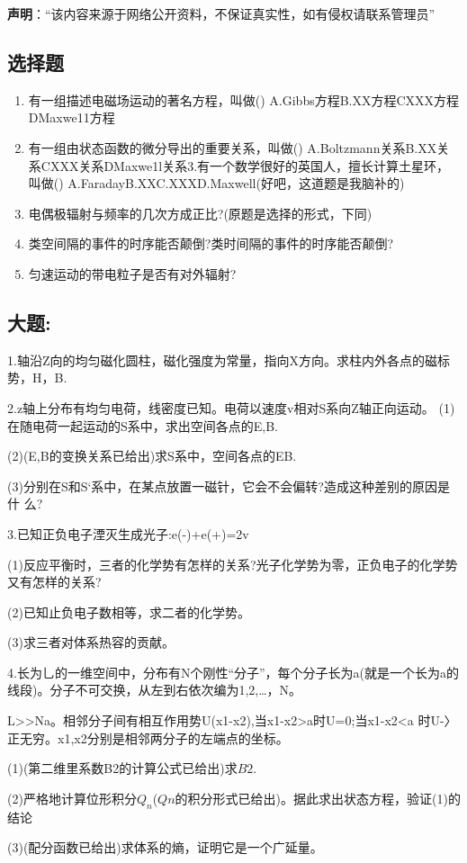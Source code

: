 
\textbf{声明}：“该内容来源于网络公开资料，不保证真实性，如有侵权请联系管理员”

\subsection{选择题}
\begin{enumerate}
\item 有一组描述电磁场运动的著名方程，叫做()
A.Gibbs方程B.XX方程CXXX方程DMaxwe11方程
\item 有一组由状态函数的微分导出的重要关系，叫做()
A.Boltzmann关系B.XX关系CXXX关系DMaxwe1l关系3.有一个数学很好的英国人，擅长计算土星环，叫做()
A.FaradayB.XXC.XXXD.Maxwell(好吧，这道题是我脑补的)
\item 电偶极辐射与频率的几次方成正比?(原题是选择的形式，下同)
\item 类空间隔的事件的时序能否颠倒?类时间隔的事件的时序能否颠倒?
\item 匀速运动的带电粒子是否有对外辐射?
\end{enumerate}
\subsection{大题:}

1.轴沿Z向的均匀磁化圆柱，磁化强度为常量，指向X方向。求柱内外各点的磁标势，H，B.

2.z轴上分布有均匀电荷，线密度已知。电荷以速度v相对S系向Z轴正向运动。
(1)在随电荷一起运动的S系中，求出空间各点的E,B.

(2)(E,B的变换关系已给出)求S系中，空间各点的EB.

(3)分别在S和S`系中，在某点放置一磁针，它会不会偏转?造成这种差别的原因是什
么?

3.已知正负电子湮灭生成光子:e(-)+e(+)=2v

(1)反应平衡时，三者的化学势有怎样的关系?光子化学势为零，正负电子的化学势又有怎样的关系?

(2)已知止负电子数相等，求二者的化学势。

(3)求三者对体系热容的贡献。

4.长为乚的一维空间中，分布有N个刚性“分子”，每个分子长为a(就是一个长为a的线段)。分子不可交换，从左到右依次编为1,2,…，N。

L>>Na。相邻分子间有相互作用势U(x1-x2),当x1-x2>a时U=0;当x1-x2<a 时U-〉正无穷。x1,x2分别是相邻两分子的左端点的坐标。

(1)(第二维里系数B2的计算公式已给出)求$B2$.

(2)严格地计算位形积分$Q_n$($Qn$的积分形式已给出)。据此求出状态方程，验证(1)的结论

(3)(配分函数已给出)求体系的熵，证明它是一个广延量。

